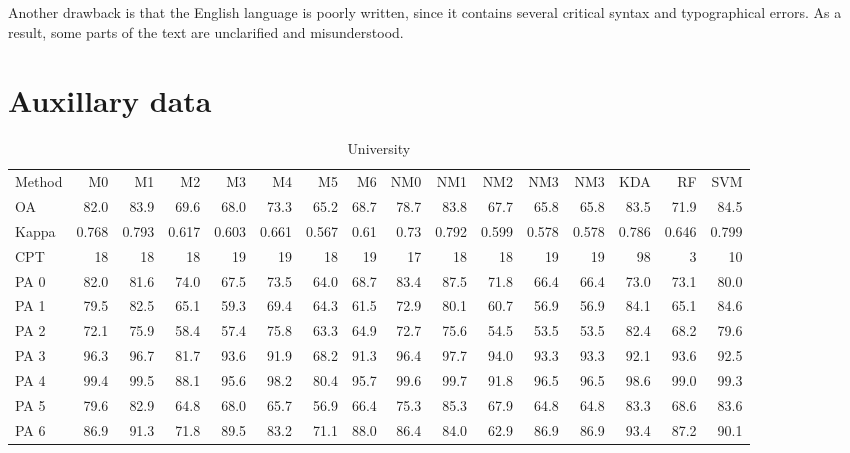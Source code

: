 \documentclass[a4paper,10pt,DIV=16]{scrartcl}
\begin{document}
\begin{revbox}
  Another drawback is that the English language is poorly written, since it contains several critical syntax and typographical errors. As a result, some parts of the text are unclarified and misunderstood.
  \begin{resbox}

  \end{resbox}
\end{revbox}
 

\section{Auxillary data}
\label{sec:auxillary}

\begin{table}[h]
  \footnotesize
  \centering
  \caption{University}
  \begin{tabular}{lrrrrrrrrrrrrrrr}
    Method & M0 & M1 & M2 & M3 & M4 & M5 & M6 & NM0 & NM1 & NM2 & NM3 & NM3 & KDA & RF & SVM \\
    OA & 82.0 & 83.9 & 69.6 & 68.0 & 73.3 & 65.2 & 68.7 & 78.7 & 83.8 & 67.7 & 65.8 & 65.8 & 83.5 & 71.9 & 84.5 \\
    Kappa & 0.768 & 0.793 & 0.617 & 0.603 & 0.661 & 0.567 & 0.61 & 0.73 & 0.792 & 0.599 & 0.578 & 0.578 & 0.786 & 0.646 & 0.799 \\
    CPT & 18 & 18 & 18 & 19 & 19 & 18 & 19 & 17 & 18 & 18 & 19 & 19 & 98 & 3 & 10 \\
    PA 0 & 82.0 & 81.6 & 74.0 & 67.5 & 73.5 & 64.0 & 68.7 & 83.4 & 87.5 & 71.8 & 66.4 & 66.4 & 73.0 & 73.1 & 80.0 \\
    PA 1 & 79.5 & 82.5 & 65.1 & 59.3 & 69.4 & 64.3 & 61.5 & 72.9 & 80.1 & 60.7 & 56.9 & 56.9 & 84.1 & 65.1 & 84.6 \\
    PA 2 & 72.1 & 75.9 & 58.4 & 57.4 & 75.8 & 63.3 & 64.9 & 72.7 & 75.6 & 54.5 & 53.5 & 53.5 & 82.4 & 68.2 & 79.6 \\
    PA 3 & 96.3 & 96.7 & 81.7 & 93.6 & 91.9 & 68.2 & 91.3 & 96.4 & 97.7 & 94.0 & 93.3 & 93.3 & 92.1 & 93.6 & 92.5 \\
    PA 4 & 99.4 & 99.5 & 88.1 & 95.6 & 98.2 & 80.4 & 95.7 & 99.6 & 99.7 & 91.8 & 96.5 & 96.5 & 98.6 & 99.0 & 99.3 \\
    PA 5 & 79.6 & 82.9 & 64.8 & 68.0 & 65.7 & 56.9 & 66.4 & 75.3 & 85.3 & 67.9 & 64.8 & 64.8 & 83.3 & 68.6 & 83.6 \\
    PA 6 & 86.9 & 91.3 & 71.8 & 89.5 & 83.2 & 71.1 & 88.0 & 86.4 & 84.0 & 62.9 & 86.9 & 86.9 & 93.4 & 87.2 & 90.1 \\

\end{tabular}
\end{table}
\end{document}
